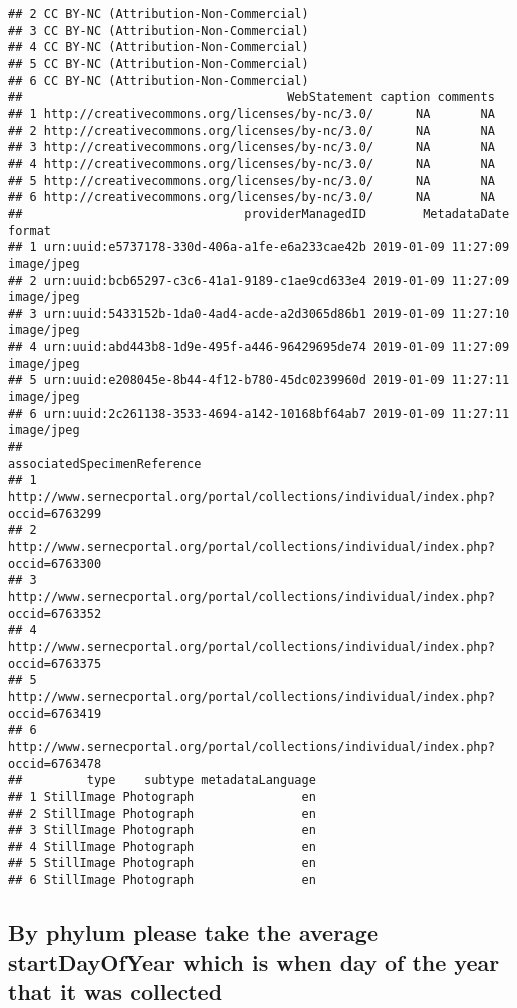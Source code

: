 \documentclass[
]{article}
\begin{document}
\begin{verbatim}
## 2 CC BY-NC (Attribution-Non-Commercial)
## 3 CC BY-NC (Attribution-Non-Commercial)
## 4 CC BY-NC (Attribution-Non-Commercial)
## 5 CC BY-NC (Attribution-Non-Commercial)
## 6 CC BY-NC (Attribution-Non-Commercial)
##                                     WebStatement caption comments
## 1 http://creativecommons.org/licenses/by-nc/3.0/      NA       NA
## 2 http://creativecommons.org/licenses/by-nc/3.0/      NA       NA
## 3 http://creativecommons.org/licenses/by-nc/3.0/      NA       NA
## 4 http://creativecommons.org/licenses/by-nc/3.0/      NA       NA
## 5 http://creativecommons.org/licenses/by-nc/3.0/      NA       NA
## 6 http://creativecommons.org/licenses/by-nc/3.0/      NA       NA
##                               providerManagedID        MetadataDate     format
## 1 urn:uuid:e5737178-330d-406a-a1fe-e6a233cae42b 2019-01-09 11:27:09 image/jpeg
## 2 urn:uuid:bcb65297-c3c6-41a1-9189-c1ae9cd633e4 2019-01-09 11:27:09 image/jpeg
## 3 urn:uuid:5433152b-1da0-4ad4-acde-a2d3065d86b1 2019-01-09 11:27:10 image/jpeg
## 4 urn:uuid:abd443b8-1d9e-495f-a446-96429695de74 2019-01-09 11:27:09 image/jpeg
## 5 urn:uuid:e208045e-8b44-4f12-b780-45dc0239960d 2019-01-09 11:27:11 image/jpeg
## 6 urn:uuid:2c261138-3533-4694-a142-10168bf64ab7 2019-01-09 11:27:11 image/jpeg
##                                                         associatedSpecimenReference
## 1 http://www.sernecportal.org/portal/collections/individual/index.php?occid=6763299
## 2 http://www.sernecportal.org/portal/collections/individual/index.php?occid=6763300
## 3 http://www.sernecportal.org/portal/collections/individual/index.php?occid=6763352
## 4 http://www.sernecportal.org/portal/collections/individual/index.php?occid=6763375
## 5 http://www.sernecportal.org/portal/collections/individual/index.php?occid=6763419
## 6 http://www.sernecportal.org/portal/collections/individual/index.php?occid=6763478
##         type    subtype metadataLanguage
## 1 StillImage Photograph               en
## 2 StillImage Photograph               en
## 3 StillImage Photograph               en
## 4 StillImage Photograph               en
## 5 StillImage Photograph               en
## 6 StillImage Photograph               en
\end{verbatim}

\hypertarget{by-phylum-please-take-the-average-startdayofyear-which-is-when-day-of-the-year-that-it-was-collected}{%
\subsection{By phylum please take the average startDayOfYear which is
when day of the year that it was
collected}\label{by-phylum-please-take-the-average-startdayofyear-which-is-when-day-of-the-year-that-it-was-collected}}
\end{document}
